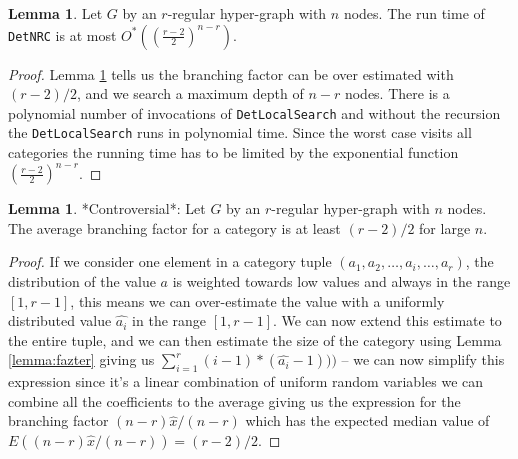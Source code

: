 \documentclass{book}
\theoremstyle{definition}
\newtheorem{lemma}[theorem]{Lemma}
\begin{document}
\begin{lemma}
  Let $G$ by an $r$-regular hyper-graph with $n$ nodes. The run time of \texttt{DetNRC} is at most $O^*((\frac{r - 2}{2})^{n - r})$.
\end{lemma}
\begin{proof}
  Lemma \ref{lemma:time} tells us the branching factor can be over estimated with $(r - 2) / 2$, and we search a maximum depth of $n - r$ nodes. There is a polynomial number of invocations of \texttt{DetLocalSearch} and without the recursion the \texttt{DetLocalSearch} runs in polynomial time. Since the worst case visits all categories the running time has to be limited by the exponential function $(\frac{r - 2}{2})^{n - r}$.
\end{proof}

\begin{lemma} \label{lemma:time}
  *Controversial*: Let $G$ by an $r$-regular hyper-graph with $n$ nodes. The average branching factor for a category is at least $(r - 2) / 2$ for large $n$.
\end{lemma}
\begin{proof}
  If we consider one element in a category tuple $(a_1, a_2, \dots, a_i, \dots, a_r)$, the distribution of the value $a$ is weighted towards low values and always in the range $[1,r-1]$, this means we can over-estimate the value with a uniformly distributed value $\hat{a_i}$ in the range $[1,r-1]$. We can now extend this estimate to the entire tuple, and we can then estimate the size of the category using Lemma \ref{lemma:fazter} giving us $\sum^r_{i=1} (i - 1) * (\hat{a_i} - 1)))$ -- we can now simplify this expression since it's a linear combination of uniform random variables we can combine all the coefficients to the average giving us the expression for the branching factor $(n-r)\hat{x}/(n - r)$ which has the expected median value of $E((n-r)\hat{x}/(n - r)) = (r - 2) / 2$.
\end{proof}




\end{document}
